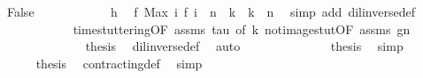 \begin{isabellebody}
\ False\isanewline
\ \ \ \ \ \ \ \ \ \ \isamarkupfalse%
\ h\ \isamarkupfalse%
\ {\isacartoucheopen}f\ {\isacharparenleft}Max\ {\isacharbraceleft}i{\isachardot}\ f\ i\ {\isasymle}\ n{\isacharbraceright}{\isacharparenright}\ {\isacharless}\ k\ {\isasymand}\ k\ {\isasymle}\ n{\isacartoucheclose}\ \isamarkupfalse%
\ {\isacharparenleft}simp\ add{\isacharcolon}\ dil{\isacharunderscore}inverse{\isacharunderscore}def{\isacharparenright}\isanewline
\ \ \ \ \ \ \ \ \ \ \isamarkupfalse%
\ time{\isacharunderscore}stuttering{\isacharbrackleft}OF\ assms\ tau{\isacharcomma}\ of\ k{\isacharbrackright}\ not{\isacharunderscore}image{\isacharunderscore}stut{\isacharbrackleft}OF\ assms\ gn{\isacharbrackright}\isanewline
\ \ \ \ \ \ \ \ \ \ \ \ \isamarkupfalse%
\ {\isacharquery}thesis\ \isamarkupfalse%
\ dil{\isacharunderscore}inverse{\isacharunderscore}def\ \isamarkupfalse%
\ auto\isanewline
\ \ \ \ \ \ \isamarkupfalse%
\isanewline
\ \ \ \ \isacommand{{\isacharbraceright}}\isamarkupfalse%
\ \isamarkupfalse%
\ {\isacharquery}thesis\ \isamarkupfalse%
\ simp\isanewline
\ \ \isamarkupfalse%
\isanewline
\isanewline
\ \ \isamarkupfalse%
\ {\isacharasterisk}\ {}\ {}\ \isamarkupfalse%
\ {\isacharquery}thesis\ \isamarkupfalse%
\ contracting{\isacharunderscore}def\ \isamarkupfalse%
\ simp\isanewline
{}\isamarkupfalse%
%
\endisatagproof
{\isafoldproof}%
%
\isadelimproof
\isanewline
%
\endisadelimproof
%
\isadelimtheory
\isanewline
%
\endisadelimtheory
%
\isatagtheory
{}\isamarkupfalse%
%
\endisatagtheory
{\isafoldtheory}%
%
\isadelimtheory
%
\endisadelimtheory
%
\end{isabellebody}%
\endinput
